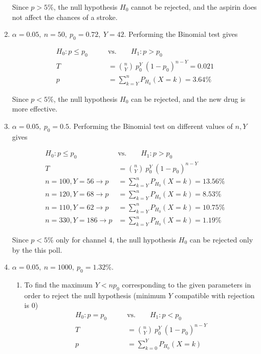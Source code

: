 \begin{enumerate}
	Since $ p > 5\% $, the null hypothesis $ H_0 $ cannot be rejected, and the aspirin does not affect the chances of a stroke.
	
	\item $\alpha = 0.05,\ n = 50,\ p_0 = 0.72,\ Y = 42$. Performing the Binomial test gives
	
	\begin{align}
		H_0 : p  \leq p_0 \qquad &\text{vs.} \qquad H_1 : p > p_0 \nonumber \\
		T &= \binom{n}{Y}\ p_0^Y\ (1-p_0)^{n-Y}  = 0.021 \nonumber \\
		p &= \sum\limits_{k = Y}^{n} P_{H_0}(X = k) = 3.64\%
	\end{align}
	
	Since $ p < 5\% $, the null hypothesis $ H_0 $ can be rejected, and the new drug is more effective.
	
	\item $\alpha = 0.05,\ p_0 = 0.5 $. Performing the Binomial test on different values of $ n, Y $ gives
	
	\begin{align}
		H_0 : p  \leq p_0 \qquad &\text{vs.} \qquad H_1 : p > p_0 \nonumber \\
		T &= \binom{n}{Y}\ p_0^Y\ (1-p_0)^{n-Y} \nonumber \\
		n = 100, Y = 56 \to p &= \sum\limits_{k = Y}^{n} P_{H_0}(X = k) = 13.56\% \nonumber \\
		n = 120, Y = 68 \to p &= \sum\limits_{k = Y}^{n} P_{H_0}(X = k) = 8.53\% \nonumber \\
		n = 110, Y = 62 \to p &= \sum\limits_{k = Y}^{n} P_{H_0}(X = k) = 10.75\% \nonumber \\
		n = 330, Y = 186 \to p &= \sum\limits_{k = Y}^{n} P_{H_0}(X = k) = 1.19\% 
	\end{align}
	
	Since $ p < 5\% $ only for channel 4, the null hypothesis $ H_0 $ can be rejected only by the this poll.
	
	\item $\alpha = 0.05,\ n = 1000,\ p_0 = 1.32\%$.
	
	\begin{enumerate}
		
		\item To find the maximum $ Y < np_0$ corresponding to the given parameters in order to reject the null hypothesis (minimum $ Y $ compatible with rejection is $ 0 $)
		\begin{align}
			H_0 : p = p_0 \qquad &\text{vs.} \qquad H_1 : p < p_0 \nonumber \\
			T &= \binom{n}{Y}\ p_0^Y\ (1-p_0)^{n-Y}  \nonumber \\
			p &= \sum\limits_{k = 0}^{Y} P_{H_0}(X = k)
		\end{align}
	

\end{enumerate}
\end{enumerate}
